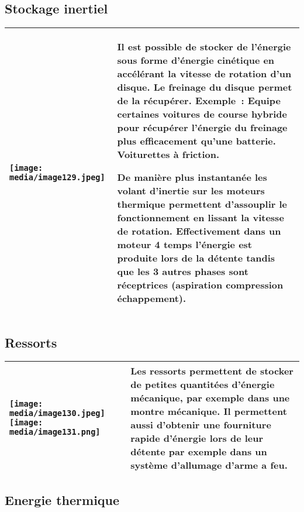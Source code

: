 \documentclass[
]{article}
\begin{document}
\hypertarget{stockage-inertiel}{%
\subsection{Stockage inertiel}\label{stockage-inertiel}}

\begin{longtable}[]{@{}
  >{\raggedright\arraybackslash}p{}
  >{\raggedright\arraybackslash}p{}@{}}
\toprule
\endhead
\texttt{[image: media/image129.jpeg]}
& Il est possible de stocker de l'énergie sous forme d'énergie cinétique
en accélérant la vitesse de rotation d'un disque. Le freinage du disque
permet de la récupérer. Exemple~: Equipe certaines voitures de course
hybride pour récupérer l'énergie du freinage plus efficacement qu'une
batterie. Voiturettes à friction.

De manière plus instantanée les volant d'inertie sur les moteurs
thermique permettent d'assouplir le fonctionnement en lissant la vitesse
de rotation. Effectivement dans un moteur 4 temps l'énergie est produite
lors de la détente tandis que les 3 autres phases sont réceptrices
(aspiration compression échappement). \\
\bottomrule
\end{longtable}

\hypertarget{ressorts}{%
\subsection{Ressorts}\label{ressorts}}

\begin{longtable}[]{@{}ll@{}}
\toprule
\endhead
\texttt{[image: media/image130.jpeg]}\texttt{[image: media/image131.png]}
& Les ressorts permettent de stocker de petites quantitées d'énergie
mécanique, par exemple dans une montre mécanique. Il permettent aussi
d'obtenir une fourniture rapide d'énergie lors de leur détente par
exemple dans un système d'allumage d'arme a feu. \\
\bottomrule
\end{longtable}

\hypertarget{energie-thermique}{%
\subsection{Energie thermique}\label{energie-thermique}}
\end{document}
